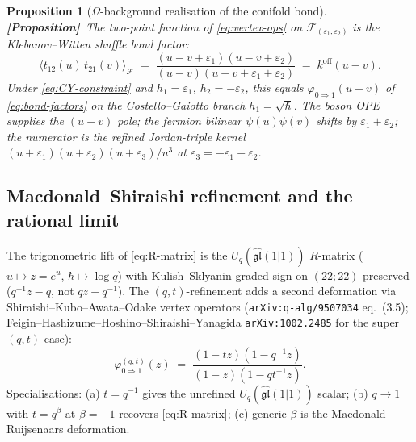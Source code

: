 \documentclass[11pt]{amsart}
\newtheorem{proposition}[theorem]{Proposition}
\theoremstyle{definition}
\providecommand{\cF}{\mathcal{F}}
\providecommand{\fgl}{\mathfrak{gl}}
\providecommand{\ClaimStatusProposition}{\textbf{\textsf{[Proposition]}}}
\begin{document}
\begin{proposition}[$\Omega$-background realisation of the conifold bond]
\label{prop:omega-bond-RTT}
\ClaimStatusProposition\
The two-point function of \eqref{eq:vertex-ops} on
$\cF_{(\varepsilon_1, \varepsilon_2)}$ is the Klebanov--Witten shuffle
bond factor:
\[
  \bigl\langle t_{12}(u)\, t_{21}(v) \bigr\rangle_{\cF}
  \;=\;
  \frac{(u - v + \varepsilon_1)(u - v + \varepsilon_2)}
       {(u - v)(u - v + \varepsilon_1 + \varepsilon_2)}
  \;=\;
  k^{\mathrm{off}}(u - v).
\]
Under \eqref{eq:CY-constraint} and $h_1 = \varepsilon_1$,
$h_2 = -\varepsilon_2$, this equals $\varphi_{0 \Rightarrow 1}(u - v)$
of \eqref{eq:bond-factors} on the Costello--Gaiotto branch
$h_1 = \sqrt{\hbar}$. The boson OPE supplies the $(u - v)$ pole; the
fermion bilinear $\psi(u)\bar\psi(v)$ shifts by
$\varepsilon_1 + \varepsilon_2$; the numerator is the refined
Jordan-triple kernel
$(u + \varepsilon_1)(u + \varepsilon_2)(u + \varepsilon_3)/u^3$ at
$\varepsilon_3 = -\varepsilon_1 - \varepsilon_2$.
\end{proposition}

\subsection*{Macdonald--Shiraishi refinement and the rational limit}
The trigonometric lift of \eqref{eq:R-matrix} is the
$U_q(\widehat{\fgl}(1|1))$ $R$-matrix ($u \mapsto z = e^u$,
$\hbar \mapsto \log q$) with Kulish--Sklyanin graded sign on $(22; 22)$
preserved ($q^{-1} z - q$, not $q z - q^{-1}$). The $(q, t)$-refinement
adds a second deformation via Shiraishi--Kubo--Awata--Odake vertex
operators (\texttt{arXiv:q-alg/9507034} eq.~(3.5);
Feigin--Hashizume--Hoshino--Shiraishi--Yanagida
\texttt{arXiv:1002.2485} for the super $(q, t)$-case):
\begin{equation}\label{eq:bond-refined}
  \varphi^{(q, t)}_{0 \Rightarrow 1}(z)
  \;=\;
  \frac{(1 - t z)(1 - q^{-1} z)}
       {(1 - z)(1 - q t^{-1} z)}.
\end{equation}
Specialisations: (a) $t = q^{-1}$ gives the unrefined
$U_q(\widehat{\fgl}(1|1))$ scalar; (b) $q \to 1$ with $t = q^\beta$ at
$\beta = -1$ recovers \eqref{eq:R-matrix}; (c) generic $\beta$ is the
Macdonald--Ruijsenaars deformation.
\end{document}
